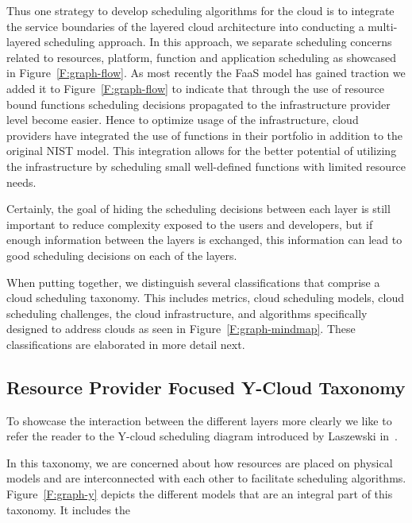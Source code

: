 \documentclass[final,5p,times,twocolumn]{elsarticle}
\begin{document}
Thus one strategy to develop scheduling algorithms for the cloud is to integrate the service boundaries of the layered cloud architecture into conducting a multi-layered scheduling approach. In this approach, we separate scheduling concerns related to resources, platform, function and application scheduling as showcased in Figure~\ref{F:graph-flow}. As most recently the FaaS model has gained traction we added it to Figure~\ref{F:graph-flow} to indicate that through the use of resource bound functions scheduling decisions propagated to the infrastructure provider level become easier. Hence to optimize usage of the infrastructure, cloud providers have integrated the use of functions in their portfolio in addition to the original NIST model. This integration allows for the better potential of utilizing the infrastructure by scheduling small well-defined functions with limited resource needs.

Certainly, the goal of hiding the scheduling decisions between each layer is still important to reduce complexity exposed to the users and developers, but if enough information between the layers is exchanged, this information can lead to good scheduling decisions on each of the layers.

When putting together, we distinguish several classifications that comprise a cloud scheduling taxonomy. This includes metrics, cloud scheduling models, cloud scheduling challenges, the cloud infrastructure, and algorithms specifically designed to address clouds as seen in Figure~\ref{F:graph-mindmap}. These classifications are elaborated in more detail next.



\subsection{Resource Provider Focused Y-Cloud Taxonomy}\label{sec:y}

To showcase the interaction between the different layers more clearly we like to refer the reader to the Y-cloud scheduling diagram introduced by Laszewski in~\cite{lasbook}.

In this taxonomy, we are concerned about how resources are placed on physical models and are interconnected with each other to facilitate scheduling algorithms. Figure~\ref{F:graph-y} depicts the different models that are an integral part of this taxonomy. It includes the
\end{document}
